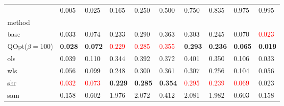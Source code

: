 \begin{tabular}{llllllllll}
\toprule
 & 0.005 & 0.025 & 0.165 & 0.250 & 0.500 & 0.750 & 0.835 & 0.975 & 0.995 \\
method &  &  &  &  &  &  &  &  &  \\
\midrule
base & 0.033 & 0.074 & 0.233 & 0.290 & 0.363 & 0.303 & 0.245 & 0.070 & \textcolor{red}{0.023} \\
\midrule
QOpt($\beta=100$) & \textbf{0.028} & \textbf{0.072} & \textcolor{red}{0.229} & \textcolor{red}{0.285} & \textcolor{red}{0.355} & \textbf{0.293} & \textbf{0.236} & \textbf{0.065} & \textbf{0.019} \\
ols & 0.039 & 0.110 & 0.344 & 0.392 & 0.372 & 0.401 & 0.350 & 0.106 & 0.033 \\
wls & 0.056 & 0.099 & 0.248 & 0.300 & 0.361 & 0.307 & 0.256 & 0.104 & 0.056 \\
shr & \textcolor{red}{0.032} & \textcolor{red}{0.073} & \textbf{0.229} & \textbf{0.285} & \textbf{0.354} & \textcolor{red}{0.295} & \textcolor{red}{0.239} & \textcolor{red}{0.069} & 0.023 \\
sam & 0.158 & 0.602 & 1.976 & 2.072 & 0.412 & 2.081 & 1.982 & 0.603 & 0.158 \\
\bottomrule
\end{tabular}